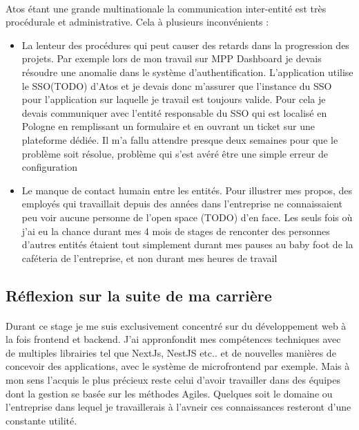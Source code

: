 \documentclass[12pt]{article}
\begin{document}
\begin {sloppypar}
\paragraph{}
Atos étant une grande multinationale la communication inter-entité est très procédurale et 
administrative. Cela à plusieurs inconvénients : 
\begin{itemize}
  \item 
    La lenteur des procédures qui peut causer des retards dans la progression des projets. Par exemple lors de mon travail 
    sur MPP Dashboard je devais résoudre une anomalie dans le système d'authentification. L'application utilise 
    le SSO(TODO) d'Atos et je devais donc m'assurer que l'instance du SSO pour l'application sur laquelle je travail 
    est toujours valide. Pour cela je devais communiquer avec l'entité responsable du SSO qui est localisé en Pologne 
    en remplissant un formulaire et en ouvrant un ticket sur une plateforme dédiée. Il m'a fallu attendre presque 
    deux semaines pour que le problème soit résolue, problème qui s'est avéré être une simple erreur de configuration
  \item 
    Le manque de contact humain entre les entités. Pour illustrer mes propos, des employés qui travaillait depuis
    des années dans l'entreprise ne connaissaient peu voir aucune personne de l'open space (TODO) d'en face. Les 
    seuls fois où j'ai eu la chance durant mes 4 mois de stages de renconter des personnes d'autres entités étaient
    tout simplement durant mes pauses au baby foot de la caféteria de l'entreprise, et non durant mes heures de travail
\end{itemize}
\newpage
\subsection{Réflexion sur la suite de ma carrière}
\paragraph{}
Durant ce stage je me suis exclusivement concentré sur du développement web à la fois frontend
et backend. J'ai appronfondit mes compétences techniques avec de multiples librairies tel que NextJs,
NestJS etc.. et de nouvelles manières de concevoir des applications, avec le système de microfrontend
par exemple. Mais à mon sens l'acquis le plus précieux reste celui d'avoir travailler dans des équipes
dont la gestion se basée sur les méthodes Agiles. Quelques soit le domaine ou l'entreprise dans lequel je travaillerais 
à l'avneir ces connaissances resteront d'une constante utilité.


\end{sloppypar}
\end{document}
